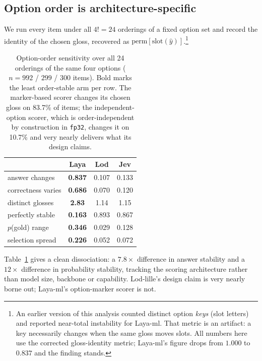 \documentclass[11pt]{article}
\newcommand{\laya}[1]{\cellcolor{fLaya}#1}
\newcommand{\lod}[1]{\cellcolor{fLod}#1}
\newcommand{\jev}[1]{\cellcolor{fJev}#1}
\newcommand{\layah}[1]{\cellcolor{cLaya!55}\textbf{#1}}
\begin{document}
\subsection{Option order is architecture-specific}
\label{sec:order}

We run every item under all $4! = 24$ orderings of a fixed option set and record
the identity of the chosen gloss, recovered as $\mathrm{perm}[\mathrm{slot}(\hat{y})]$.\footnote{%
An earlier version of this analysis counted distinct option \emph{keys} (slot
letters) and reported near-total instability for Laya-ml. That metric is an
artifact: a key necessarily changes when the same gloss moves slots. All numbers
here use the corrected gloss-identity metric; Laya-ml's figure drops from $1.000$
to $0.837$ and the finding stands.}

\begin{table}[t]
\centering\small
\setlength{\tabcolsep}{4pt}
\begin{tabular}{lccc}
\toprule
& \laya{\textbf{Laya}} & \lod{\textbf{Lod}} & \jev{\textbf{Jev}} \\
\midrule
answer changes      & \layah{0.837} & \lod{0.107} & \jev{0.133} \\
correctness varies  & \layah{0.686} & \lod{0.070} & \jev{0.120} \\
distinct glosses    & \layah{2.83}  & \lod{1.14}  & \jev{1.15}  \\
perfectly stable    & \layah{0.163} & \lod{0.893} & \jev{0.867} \\
$p$(gold) range     & \layah{0.346} & \lod{0.029} & \jev{0.128} \\
selection spread    & \layah{0.226} & \lod{0.052} & \jev{0.072} \\
\bottomrule
\end{tabular}
\caption{Option-order sensitivity over all 24 orderings of the same four options
($n = 992$ / $299$ / $300$ items). Bold marks the least order-stable arm per row. The
marker-based scorer changes its chosen gloss on 83.7\% of items; the
independent-option scorer, which is order-independent by construction in
\texttt{fp32}, changes it on 10.7\% and very nearly delivers what its design
claims.}
\label{tab:order}
\end{table}

Table~\ref{tab:order} gives a clean dissociation: a $7.8\times$ difference in
answer stability and a $12\times$ difference in probability stability, tracking
the scoring architecture rather than model size, backbone or capability.
Lod-lille's design claim is very nearly borne out; Laya-ml's option-marker scorer
is not.
\end{document}
